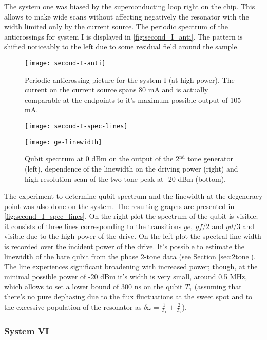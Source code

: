 The system one was biased by the superconducting loop right on the chip. This allows to make wide scans without affecting negatively the resonator with the width limited only by the current source. The periodic spectrum of the anticrossings for system I is displayed in \autoref{fig:second_I_anti}. The pattern is shifted noticeably to the left due to some residual field around the sample.

\begin{figure}[h]
\centering
\texttt{[image: second-I-anti]}
\caption{Periodic anticrossing picture for the system I (at high power). The current on the current source spans 80 mA and is actually comparable at the endpoints to it's maximum possible output of 105 mA.}
\label{fig:second_I_anti}
\end{figure}

\begin{figure}[h]
\centering
\texttt{[image: second-I-spec-lines]}

\texttt{[image: ge-linewidth]}
\caption{Qubit spectrum at 0 dBm on the output of the 2$^{\text{nd}}$ tone generator (left), dependence of the linewidth on the driving power (right) and high-resolution scan of the two-tone peak at -20 dBm (bottom).}
\label{fig:second_I_spec_lines}
\end{figure}


The experiment to determine qubit spectrum and the linewidth at the degeneracy point was also done on the system. The resulting graphs are presented in \autoref{fig:second_I_spec_lines}. On the right plot the spectrum of the qubit is visible; it consists of three lines corresponding to the transitions $ge,\ gf/2$ and $gd/3$ and visible due to the high power of the drive. On the left plot the spectral line width is recorded over the incident power of the drive. It's possible to estimate the linewidth of the bare qubit from the phase 2-tone data (see Section \ref{sec:2tone}). The line experiences significant broadening with increased power; though, at the minimal possible power of -20 dBm it's width is very small, around 0.5 MHz, which allows to set a lower bound of 300 ns on the qubit $T_1$ (assuming that there's no pure dephasing due to the flux fluctuations at the sweet spot and to the excessive population of the resonator as $\delta\omega = \frac{1}{T_1}+\frac{2}{T_2}$).

\subsubsection{System VI}

